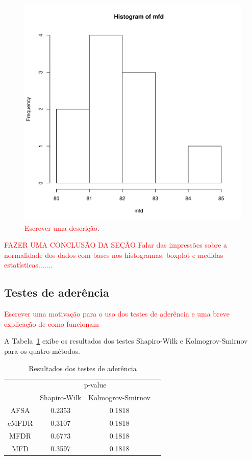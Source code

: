 \documentclass[conference]{IEEEtran}
\begin{document}
\begin{figure}[h]
	\centering
	\includegraphics[width=\linewidth]{img/hist_mfd.pdf}
	\caption{\textcolor{red}{Escrever uma descrição}.}
	\label{fig:hist_mfd}
\end{figure}




\textcolor{red}{FAZER UMA CONCLUSÃO DA SEÇÃO
Falar das impressões sobre a normalidade dos dados com bases nos histogramas, boxplot e medidas estatísticas.......}

\subsection{Testes de aderência}

\textcolor{red}{Escrever uma motivação para o uso dos testes de aderência e uma breve explicação de como funcionam}

A Tabela~\ref{tab:aderencia} exibe os resultados dos testes Shapiro-Wilk e Kolmogrov-Smirnov para os quatro métodos.

\begin{table}[h]
	\centering
	\caption{Resultados dos testes de aderência}
	\label{tab:aderencia}
	\begin{tabular}{c|ccc}
		\hline
		& \multicolumn{2}{c}{p-value}      \\
		\cline{2-3}
		& Shapiro-Wilk & Kolmogrov-Smirnov \\
		\hline
		AFSA  & 0.2353       & 0.1818            \\
		cMFDR & 0.3107       & 0.1818            \\
		MFDR  & 0.6773       & 0.1818            \\
		MFD   & 0.3597       &  0.1818               \\
		\hline
	\end{tabular}
\end{table}
\end{document}
